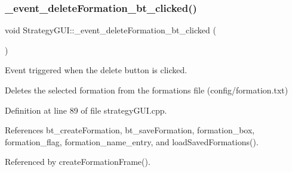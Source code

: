 \subsubsection{\texorpdfstring{\+\_\+event\+\_\+delete\+Formation\+\_\+bt\+\_\+clicked()}{\_event\_deleteFormation\_bt\_clicked()}}
{\footnotesize\ttfamily void Strategy\+G\+U\+I\+::\+\_\+event\+\_\+delete\+Formation\+\_\+bt\+\_\+clicked (\begin{DoxyParamCaption}{ }\end{DoxyParamCaption})\hspace{0.3cm}{\ttfamily [private]}}



Event triggered when the delete button is clicked. 

Deletes the selected formation from the formations file (config/formation.\+txt) 

Definition at line 89 of file strategy\+G\+U\+I.\+cpp.



References bt\+\_\+create\+Formation, bt\+\_\+save\+Formation, formation\+\_\+box, formation\+\_\+flag, formation\+\_\+name\+\_\+entry, and load\+Saved\+Formations().



Referenced by create\+Formation\+Frame().


